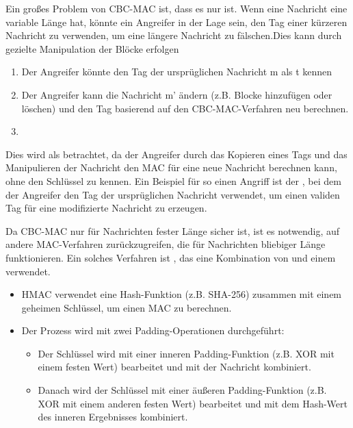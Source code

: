 \begin{infoBox}[title=Probleme mit CBC-MAC für Nachrichten unterschiedlicher Länge]
    Ein großes Problem von CBC-MAC ist, dass es nur  ist. Wenn eine Nachricht eine variable Länge hat, könnte ein Angreifer in der Lage sein, den Tag einer kürzeren Nachricht zu verwenden, um eine längere Nachricht zu fälschen.Dies kann durch gezielte Manipulation der Blöcke erfolgen\\
    \begin{enumerate}
        \item {} Der Angreifer könnte den Tag der ursprüglichen Nachricht m als t kennen
        \item {} Der Angreifer kann die Nachricht m' ändern (z.B. Blocke hinzufügen oder löschen) und den Tag basierend auf den CBC-MAC-Verfahren neu berechnen.
        \item {}
    \end{enumerate}
    Dies wird als  betrachtet, da der Angreifer durch das Kopieren eines Tags und das Manipulieren der Nachricht den MAC für eine neue Nachricht berechnen kann, ohne den Schlüssel zu kennen. Ein Beispiel für so einen Angriff ist der , bei dem der Angreifer den Tag der ursprüglichen Nachricht verwendet, um einen validen Tag für eine modifizierte Nachricht zu erzeugen.
\end{infoBox}
\begin{infoBox}[title=HMAC (Hash-based Message Authentification Code)]
    Da CBC-MAC nur für Nachrichten fester Länge sicher ist, ist es notwendig, auf andere MAC-Verfahren zurückzugreifen, die für Nachrichten bliebiger Länge funktionieren. Ein solches Verfahren ist , das eine Kombination von  und einem  verwendet.\\
    \begin{itemize}
        \item HMAC verwendet eine Hash-Funktion (z.B. SHA-256) zusammen mit einem geheimen Schlüssel, um einen MAC zu berechnen.
        \item Der Prozess wird mit zwei Padding-Operationen durchgeführt:
        \begin{itemize}
            \item {} Der Schlüssel wird mit einer inneren Padding-Funktion (z.B. XOR mit einem festen Wert) bearbeitet und mit der Nachricht kombiniert.
            \item {} Danach wird der Schlüssel mit einer äußeren Padding-Funktion (z.B. XOR mit einem anderen festen Wert) bearbeitet und mit dem Hash-Wert des inneren Ergebnisses kombiniert.
        \end{itemize}
    \end{itemize}
\end{infoBox}
\clearpage
